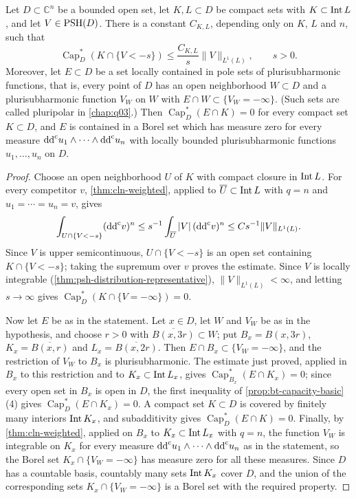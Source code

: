 \begin{proposition}\label{prop:bt-poles-zero-capacity}
Let $D\subset\mathbb C^n$ be a bounded open set, let $K,L\subset D$ be compact sets with $K\subset\operatorname{Int} L$, and let $V\in\mathrm{PSH}(D)$. There is a constant $C_{K,L}$, depending only on $K$, $L$ and $n$, such that
\[
 \operatorname{Cap}_D^*(K\cap\{V<-s\})
                 \le\frac{C_{K,L}}{s}\|V\|_{L^1(L)},\qquad s>0.
\]
Moreover, let $E\subset D$ be a set locally contained in pole sets of plurisubharmonic functions, that is, every point of $D$ has an open neighborhood $W\subset D$ and a plurisubharmonic function $V_W$ on $W$ with $E\cap W\subset\{V_W=-\infty\}$. (Such sets are called pluripolar in \cref{chap:q03}.) Then $\operatorname{Cap}^*_D(E\cap K)=0$ for every compact set $K\subset D$, and $E$ is contained in a Borel set which has measure zero for every measure $\mathrm{dd}^{\mathrm{c}} u_1\wedge\cdots\wedge\mathrm{dd}^{\mathrm{c}} u_n$ with locally bounded plurisubharmonic functions $u_1,\ldots,u_n$ on $D$.
\end{proposition}
\begin{proof}
Choose an open neighborhood $U$ of $K$ with compact closure in $\operatorname{Int} L$. For every competitor $v$, \cref{thm:cln-weighted}, applied to $\overline U\subset\operatorname{Int} L$ with $q=n$ and $u_1=\cdots=u_n=v$, gives
\[
 \int_{U\cap\{V<-s\}}(\mathrm{dd}^{\mathrm{c}} v)^n\le s^{-1}\int_{\overline U}|V|\,(\mathrm{dd}^{\mathrm{c}} v)^n
\le C s^{-1}\|V\|_{L^1(L)}.
\]
Since $V$ is upper semicontinuous, $U\cap\{V<-s\}$ is an open set containing $K\cap\{V<-s\}$; taking the supremum over $v$ proves the estimate. Since $V$ is locally integrable (\cref{thm:psh-distribution-representative}), $\|V\|_{L^1(L)}<\infty$, and letting $s\to\infty$ gives $\operatorname{Cap}^*_D(K\cap\{V=-\infty\})=0$.

Now let $E$ be as in the statement. Let $x\in D$, let $W$ and $V_W$ be as in the hypothesis, and choose $r>0$ with $\overline{B(x,3r)}\subset W$; put $B_x=B(x,3r)$, $K_x=\overline{B(x,r)}$ and $L_x=\overline{B(x,2r)}$. Then $E\cap B_x\subset\{V_W=-\infty\}$, and the restriction of $V_W$ to $B_x$ is plurisubharmonic. The estimate just proved, applied in $B_x$ to this restriction and to $K_x\subset\operatorname{Int} L_x$, gives $\operatorname{Cap}^*_{B_x}(E\cap K_x)=0$; since every open set in $B_x$ is open in $D$, the first inequality of \cref{prop:bt-capacity-basic}(4) gives $\operatorname{Cap}^*_D(E\cap K_x)=0$. A compact set $K\subset D$ is covered by finitely many interiors $\operatorname{Int} K_x$, and subadditivity gives $\operatorname{Cap}^*_D(E\cap K)=0$. Finally, by \cref{thm:cln-weighted}, applied on $B_x$ to $K_x\subset\operatorname{Int} L_x$ with $q=n$, the function $V_W$ is integrable on $K_x$ for every measure $\mathrm{dd}^{\mathrm{c}} u_1\wedge\cdots\wedge\mathrm{dd}^{\mathrm{c}} u_n$ as in the statement, so the Borel set $K_x\cap\{V_W=-\infty\}$ has measure zero for all these measures. Since $D$ has a countable basis, countably many sets $\operatorname{Int} K_x$ cover $D$, and the union of the corresponding sets $K_x\cap\{V_W=-\infty\}$ is a Borel set with the required property.
\end{proof}

